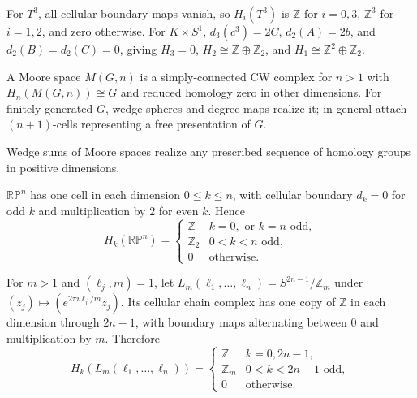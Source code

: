 \begin{example}
\label{ex:three-torus}
For $T^3$, all cellular boundary maps vanish, so $H_i(T^3)$ is $\mathbb{Z}$ for $i=0,3$, $\mathbb{Z}^3$ for $i=1,2$, and zero otherwise.  For $K\times S^1$, $d_3(c^3)=2C$, $d_2(A)=2b$, and $d_2(B)=d_2(C)=0$, giving $H_3=0$, $H_2\cong\mathbb{Z}\oplus\mathbb{Z}_2$, and $H_1\cong\mathbb{Z}^2\oplus\mathbb{Z}_2$.
\end{example}

\begin{example}
\label{ex:moore-spaces}
A Moore space $M(G,n)$ is a simply-connected CW complex for $n>1$ with $H_n(M(G,n))\cong G$ and reduced homology zero in other dimensions.  For finitely generated $G$, wedge spheres and degree maps realize it; in general attach $(n+1)$-cells representing a free presentation of $G$.
\end{example}

\begin{example}
\label{ex:cellular-homology-cpn}
Wedge sums of Moore spaces realize any prescribed sequence of homology groups in positive dimensions.
\end{example}

\begin{example}
\label{ex:cellular-homology-rpn}
$\mathbb{RP}^n$ has one cell in each dimension $0\leq k\leq n$, with cellular boundary $d_k=0$ for odd $k$ and multiplication by $2$ for even $k$.  Hence
\[
H_k(\mathbb{RP}^n)=\begin{cases}\mathbb{Z}&k=0,\text{ or }k=n\text{ odd},\\\mathbb{Z}_2&0<k<n\text{ odd},\\0&\text{otherwise}.\end{cases}
\]
\end{example}

\begin{example}
\label{ex:lens-spaces}
For $m>1$ and $(\ell_j,m)=1$, let $L_m(\ell_1,\ldots,\ell_n)=S^{2n-1}/\mathbb{Z}_m$ under $(z_j)\mapsto(e^{2\pi i\ell_j/m}z_j)$.  Its cellular chain complex has one copy of $\mathbb{Z}$ in each dimension through $2n-1$, with boundary maps alternating between $0$ and multiplication by $m$.  Therefore
\[
H_k(L_m(\ell_1,\ldots,\ell_n))=\begin{cases}\mathbb{Z}&k=0,2n-1,\\\mathbb{Z}_m&0<k<2n-1\text{ odd},\\0&\text{otherwise}.\end{cases}
\]
\end{example}


